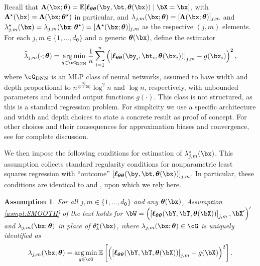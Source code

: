 \documentclass[12pt]{article}
\newtheorem{assumption}{Assumption}
\numberwithin{equation}{section}
\theoremstyle{definition}
\DeclareMathOperator*{\argmin}{arg\,min}
\newcommand{\E}{\mathbb{E}}
\newcommand{\btheta}{\boldsymbol{\theta}}
\newcommand{\bL}{\boldsymbol{\Lambda}}
\newcommand{\ttrue}{\theta^\star}
\newcommand{\bttrue}{\btheta^\star}
\newcommand{\bLtrue}{\bL^\star}
\newcommand{\ltrue}{\lambda^\star}
\newcommand{\lhat}{\widehat{\lambda}}
\newcommand{\dc}{d_c}  %
\newcommand{\dtheta}{d_{\btheta}}  %
\begin{document}
\begin{appendices}
Recall that $\bL(\bx; \btheta) = \E [  \bm{\ell}_{\btheta\btheta}(\by,\bt, \btheta(\bx)) \mid \bX = \bx ]$, with $\bLtrue(\bx) = \bL(\bx; \bttrue)$ in particular, and $\lambda_{j,m}(\bx; \btheta) = [\bL(\bx; \btheta)]_{j,m}$ and $\ltrue_{j,m}(\bx) = \lambda_{j,m}(\bx; \bttrue) = [\bLtrue(\bx; \btheta)]_{j,m}$ as the respective $(j,m)$ elements. For each $j, m \in \{1,\ldots,\dtheta\}$ and a generic $\btheta(\bx)$, define the estimator
\begin{align}
	\label{appxeqn:lambda hat}
	\lhat_{j,m}(\cdot; \btheta) = \argmin_{g \in \cG_{\rm DNN} } \frac{1}{n}\sum_{i=1}^n \left( \left[\bm{\ell}_{\btheta\btheta}(\by_i,\bt_i, \btheta(\bx_i))\right]_{j,m}  -  g(\bx_i)\right)^2,
\end{align}
where $\cG_{\rm DNN}$ is an MLP class of neural networks, assumed to have width and depth proportional to $n^{\frac{\dc}{4p + 2\dc}} \log^2 n$ and $\log n$, respectively, with unbounded parameters and bounded output functions $g(\cdot)$. This class is not structured, as this is a standard regression problem. For simplicity we use a specific architecture and width and depth choices to state a concrete result as proof of concept. For other choices and their consequences for approximation biases and convergence, see \cite{Farrell-Liang-Misra2021_Ecma} for complete discussion.  


We then impose the following conditions for estimation of $\ltrue_{j,m}(\bx)$. This assumption collects standard regularity conditions for nonparametric least squares regression with ``outcome'' $\left[\bm{\ell}_{\btheta\btheta}(\by,\bt, \btheta(\bx))\right]_{j,m}$. In particular, these conditions are identical to \cite{Farrell-Liang-Misra2021_Ecma} and \cite{Tang2025_WP}, upon which we rely here.
\begin{assumption}
	\label{asmpt:lambda}
	For all $j, m \in \{1,\ldots,\dtheta\}$ and any $\btheta(\bx)$, Assumption \ref{asmpt:SMOOTH} of the text holds for $\bW = \left( \left[\bm{\ell}_{\btheta\btheta}(\bY,\bT, \btheta(\bX))\right]_{j,m} , \bX'\right)'$ and $\lambda_{j,m}(\bx; \btheta)$ in place of $\ttrue_k(\bx)$, where $\lambda_{j,m}(\bx; \btheta) \in \cG$ is uniquely identified as
		\[	\lambda_{j,m}(\bx; \btheta) = \argmin_{g \in \cG } \E \left[\left( \left[\bm{\ell}_{\btheta\btheta}(\bY, \bT, \btheta(\bX))\right]_{j,m}  -  g(\bX)\right)^2 \right]. \]
\end{assumption}




\end{appendices}
\end{document}
